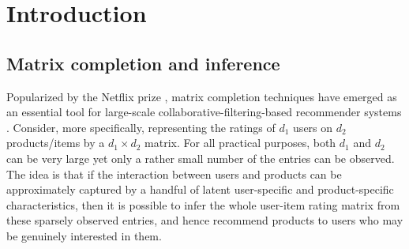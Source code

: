 \documentclass[12pt]{article}
\theoremstyle{plain}
\begin{document}
\begin{sloppypar}

\section{Introduction}\label{sec:intro}
\subsection{Matrix completion and inference}
Popularized by the Netflix prize \citep{bennett2007netflix}, matrix completion techniques have emerged as an essential tool for large-scale collaborative-filtering-based recommender systems \citep{schafer2007collaborative}. Consider, more specifically, representing the ratings of $d_1$ users on $d_2$ products/items by a $d_1\times d_2$ matrix. For all practical purposes, both $d_1$ and $d_2$ can be very large yet only a rather small number of the entries can be observed. The idea is that if the interaction between users and products can be approximately captured by a handful of latent user-specific and product-specific characteristics, then it is possible to infer the whole user-item rating matrix from these sparsely observed entries, and hence recommend products to users who may be genuinely interested in them. 


\end{sloppypar}
\end{document}

